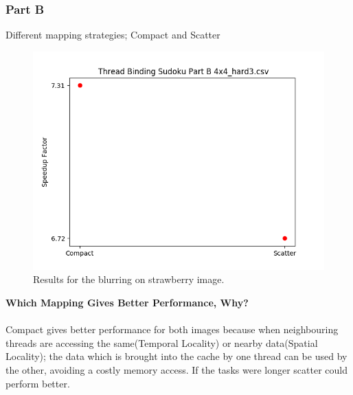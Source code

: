 \documentclass{article}
\newcommand\tab[1][0.5cm]{\hspace*{#1}}
\begin{document}
\subsubsection{Part B}
\begin{description}
    \item[Different mapping strategies; Compact and Scatter]
\end{description}
\begin{figure}[!htb]
    \centering
    \includegraphics[width=1\linewidth]{./img/binding_part_2_B.png}
    \caption{Results for the blurring on strawberry image.}
\end{figure}
\textbf{Which Mapping Gives Better Performance, Why?}\\
\\ \tab Compact gives better performance for both images because 
when neighbouring threads are accessing the same(Temporal Locality) or nearby data(Spatial Locality);
the data which is brought into the cache by one thread can be used 
by the other, avoiding a costly memory access.
If the tasks were longer scatter could perform better. 

\newpage
\end{document}
